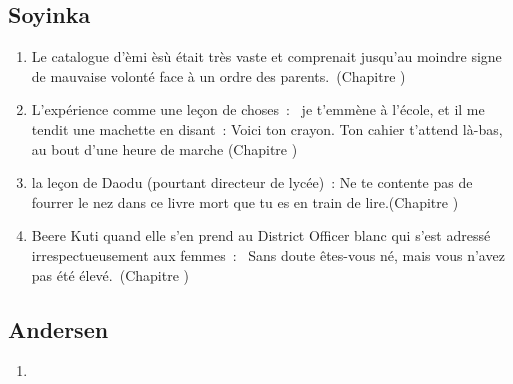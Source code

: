 \documentclass[a4paper, 11pt, hidelinks]{article}
\newcommand{\rb}[1]{\Romanbar{#1}}
\begin{document}
\subsection{Soyinka}


\begin{enumerate}
    \item Le catalogue d'èmi èsù était très vaste et comprenait jusqu'au moindre signe de mauvaise volonté face à un ordre des parents. (Chapitre \rb{6})
    \item L'expérience comme une leçon de choses : \og je t'emmène à l'école, et il me tendit une machette en disant : Voici ton crayon. Ton cahier t'attend là-bas, au bout d'une heure de marche \fg (Chapitre \rb{9})
    \item la leçon de Daodu (pourtant directeur de lycée) : \og Ne te contente pas de fourrer le nez dans ce livre mort que tu es en train de lire.\fg (Chapitre \rb{15})
    \item Beere Kuti quand elle s'en prend au District Officer blanc qui s'est adressé irrespectueusement aux femmes : \og Sans doute êtes-vous né, mais vous n'avez pas été élevé.\fg (Chapitre \rb{14})
\end{enumerate}




\subsection{Andersen}


\begin{enumerate}
    \item 
\end{enumerate}
\end{document}
